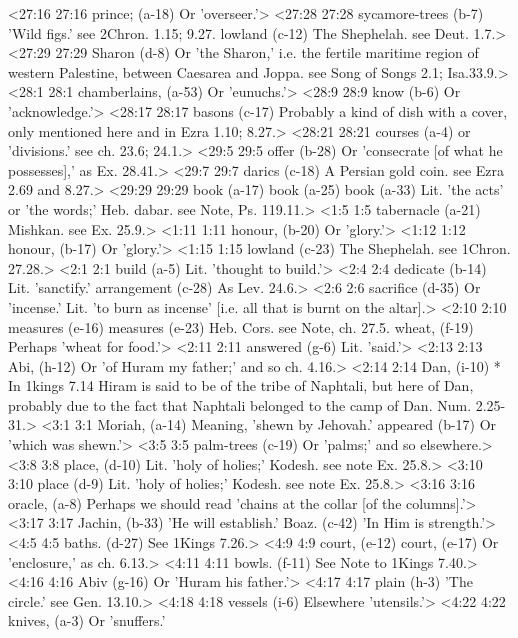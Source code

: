 <27:16 27:16  prince; (a-18)  Or 'overseer.'>
<27:28 27:28  sycamore-trees (b-7)  'Wild figs.' see 2Chron. 1.15; 9.27.
  lowland (c-12)  The Shephelah. see Deut. 1.7.>
<27:29 27:29  Sharon (d-8)  Or 'the Sharon,' i.e. the fertile maritime region of western  Palestine, between Caesarea and Joppa. see Song of Songs 2.1;  Isa.33.9.>
<28:1 28:1  chamberlains, (a-53)  Or 'eunuchs.'>
<28:9 28:9  know (b-6)  Or 'acknowledge.'>
<28:17 28:17  basons (c-17)  Probably a kind of dish with a cover, only mentioned here and  in Ezra 1.10; 8.27.>
<28:21 28:21  courses (a-4)  or 'divisions.' see ch. 23.6; 24.1.>
<29:5 29:5  offer (b-28)  Or 'consecrate [of what he possesses],' as Ex. 28.41.>
<29:7 29:7  darics (c-18)  A Persian gold coin. see Ezra 2.69 and 8.27.>
<29:29 29:29  book (a-17)  book (a-25)  book (a-33)
  Lit. 'the acts' or 'the words;' Heb. dabar. see Note, Ps. 119.11.>
<1:5 1:5  tabernacle (a-21)  Mishkan. see Ex. 25.9.>
<1:11 1:11  honour, (b-20) Or 'glory.'>
<1:12 1:12  honour, (b-17)  Or 'glory.'>
<1:15 1:15  lowland (c-23)  The Shephelah. see 1Chron. 27.28.>
<2:1 2:1  build (a-5)  Lit. 'thought to build.'>
<2:4 2:4  dedicate (b-14)  Lit. 'sanctify.'
  arrangement (c-28)  As Lev. 24.6.>
<2:6 2:6  sacrifice (d-35)  Or 'incense.' Lit. 'to burn as incense' [i.e. all that is  burnt on the altar].>
<2:10 2:10  measures (e-16)  measures (e-23)
  Heb. Cors. see Note, ch. 27.5.
  wheat, (f-19)  Perhaps 'wheat for food.'>
<2:11 2:11  answered (g-6)  Lit. 'said.'>
<2:13 2:13  Abi, (h-12)  Or 'of Huram my father;' and so ch. 4.16.>
<2:14 2:14  Dan, (i-10)  * In 1kings 7.14 Hiram is said to be of the tribe of  Naphtali, but here of Dan, probably due to the fact that  Naphtali belonged to the camp of Dan. Num. 2.25-31.>
<3:1 3:1  Moriah, (a-14)  Meaning, 'shewn by Jehovah.'
  appeared (b-17)  Or 'which was shewn.'>
<3:5 3:5  palm-trees (c-19)  Or 'palms;' and so elsewhere.>
<3:8 3:8  place, (d-10) Lit. 'holy of holies;' Kodesh. see note Ex. 25.8.>
<3:10 3:10  place (d-9)  Lit. 'holy of holies;' Kodesh. see note Ex. 25.8.>
<3:16 3:16  oracle, (a-8)  Perhaps we should read 'chains at the collar [of the  columns].'>
<3:17 3:17  Jachin, (b-33)  'He will establish.'
  Boaz. (c-42)  'In Him is strength.'>
<4:5 4:5  baths. (d-27)  See 1Kings 7.26.>
<4:9 4:9  court, (e-12)  court, (e-17)
  Or 'enclosure,' as ch. 6.13.>
<4:11 4:11  bowls. (f-11)  See Note to 1Kings 7.40.>
<4:16 4:16  Abiv (g-16)  Or 'Huram his father.'>
<4:17 4:17  plain (h-3)  'The circle.' see Gen. 13.10.>
<4:18 4:18  vessels (i-6)  Elsewhere 'utensils.'>
<4:22 4:22  knives, (a-3)  Or 'snuffers.'
